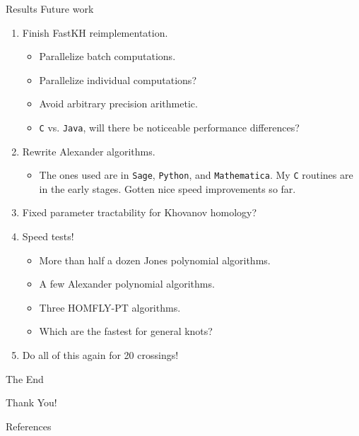 \documentclass{beamer}
\begin{document}
    \begin{frame}{Results}
        Future work
        \begin{enumerate}
            \item Finish FastKH reimplementation.
            \begin{itemize}
                \item Parallelize batch computations.
                \item Parallelize individual computations?
                \item Avoid arbitrary precision arithmetic.
                \item \texttt{C} vs. \texttt{Java}, will there be noticeable
                    performance differences?
            \end{itemize}
            \item Rewrite Alexander algorithms.
            \begin{itemize}
                \item The ones used are in \texttt{Sage}, \texttt{Python}, and
                    \texttt{Mathematica}. My \texttt{C} routines are in the
                    early stages. Gotten nice speed improvements so far.
            \end{itemize}
            \item Fixed parameter tractability for Khovanov homology?
            \item Speed tests!
            \begin{itemize}
                \item More than half a dozen Jones polynomial algorithms.
                \item A few Alexander polynomial algorithms.
                \item Three HOMFLY-PT algorithms.
                \item Which are the fastest for general knots?
            \end{itemize}
            \item Do all of this again for 20 crossings!
        \end{enumerate}
    \end{frame}
    \begin{frame}{The End}
        \begin{center}
            Thank You!
        \end{center}
    \end{frame}
    \begin{frame}[allowframebreaks]{References}
        
        
    \end{frame}
\end{document}

